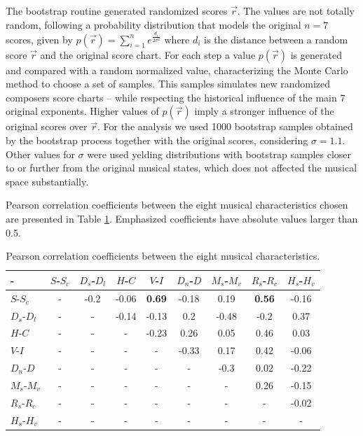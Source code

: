 \documentclass[
 aip,
 jmp,
 amsmath,amssymb,
 reprint,
]{revtex4-1}
\begin{document}
The bootstrap routine generated randomized scores $\vec{r}$. The
values are not totally random, following a probability distribution
that models the original $n = 7$ scores, given by 
$p(\vec{r}) = \sum^n_{i=1} e^{\frac{d_i}{2\sigma^2}}$
where $d_i$ is the distance between a random score $\vec{r}$
and the original score chart. For each step a
value $p(\vec{r})$ is generated and compared with a random normalized value,
characterizing the Monte Carlo~\cite{Robert2011} method to choose a set of samples. This
samples simulates new randomized composers score charts -- while respecting the
historical influence of the main 7 original exponents. Higher
values of $p(\vec{r})$ imply a stronger influence of the original scores
over $\vec{r}$. For the analysis
we used 1000 bootstrap samples obtained by the bootstrap process
together with the original scores,
considering $\sigma = 1.1$. Other values for $\sigma$ were used yelding 
distributions with bootstrap samples closer to or further from the original 
musical states, which does not affected the musical space substantially.

Pearson correlation coefficients between the eight musical
characteristics chosen are presented in Table \ref{tab:tableB}.
Emphasized coefficients have absolute values larger than 0.5.

\begin{table}[ht]
\caption{\label{tab:tableB}Pearson correlation coefficients between
  the eight musical characteristics.}

\begin{ruledtabular}
\begin{tabular}{|l||c|c|c|c|c|c|c|c|}

-   & $S$-$S_c$ & $D_s$-$D_l$ & $H$-$C$ & $V$-$I$ & $D_n$-$D$ & $M_s$-$M_v$ & $R_s$-$R_c$ & $H_s$-$H_v$ \\ \hline
$S$-$S_c$ & -     &  -0.2 &  -0.06 &  \textbf{0.69}  & -0.18 &  0.19   &  \textbf{0.56} &  -0.16 \\
$D_s$-$D_l$ & -     &  -     &  -0.14 &  -0.13          &  0.2  &  -0.48  &  -0.2         &  0.37 \\
$H$-$C$ & -     &  -     &  -     &  -0.23          &  0.26  &  0.05  &  0.46          &  0.03 \\
$V$-$I$ & -     &  -     &  -     &  -              & -0.33 &  0.17   &  0.42          &  -0.06 \\
$D_n$-$D$ & -     &  -     &  -     &  -              &  -    &  -0.3  &  0.02          &  -0.22 \\
$M_s$-$M_v$ & -     &  -     &  -     &  -              &  -    &  -      &  0.26          &  -0.15 \\
$R_s$-$R_c$ & -     &  -     &  -     &  -              &  -    &  -      &  -             &  -0.02 \\
$H_s$-$H_v$ & -     &  -     &  -     &  -              &  -    &  -      &  -             &  - \\

\end{tabular}
\end{ruledtabular}
\end{table}
\end{document}
